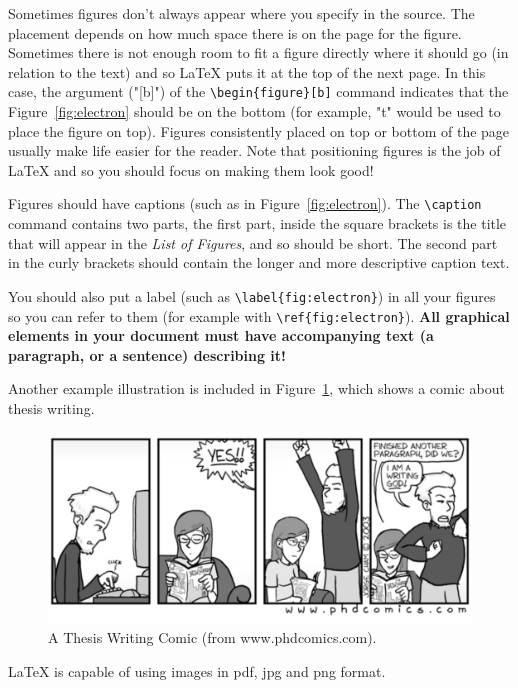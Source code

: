 Sometimes figures don't always appear where you specify in the source. The placement depends on how much space there is on the page for the figure. Sometimes there is not enough room to fit a figure directly where it should go (in relation to the text) and so \LaTeX{} puts it at the top of the next page. In this case, the argument ("[b]") of the \verb|\begin{figure}[b]| command indicates that the Figure~\ref{fig:electron} should be on the bottom (for example, "t" would be used to place the figure on top). Figures consistently placed on top or bottom of the page usually make life easier for the reader. Note that positioning figures is the job of \LaTeX{} and so you should focus on making them look good! 

Figures should have captions (such as in Figure~\ref{fig:electron}). The \verb|\caption| command contains two parts, the first part, inside the square brackets is the title that will appear in the \emph{List of Figures}, and so should be short. The second part in the curly brackets should contain the longer and more descriptive caption text. 

You should also put a label (such as \verb|\label{fig:electron}|) in all your figures so you can refer to them (for example with \verb|\ref{fig:electron}|). {\bf All graphical elements in your document must have accompanying text (a paragraph, or a sentence) describing it!}

Another example illustration is included in Figure~\ref{fig:comic}, which shows a comic about thesis writing.

\begin{figure}[t]
\centering
\includegraphics[width=\textwidth,keepaspectratio]{ch2/assets/comic}
\caption[Thesis Writing Comic]{A Thesis Writing Comic (from www.phdcomics.com).}
\label{fig:comic}
\end{figure}

\LaTeX{} is capable of using images in pdf, jpg and png format.

